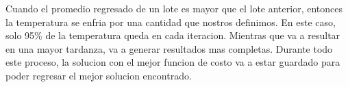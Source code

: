 \documentclass{article}
\begin{document}
    Cuando el promedio regresado de un lote es mayor que el lote anterior, entonces la temperatura se enfria
    por una cantidad que nostros definimos. En este caso, solo 95\% de la temperatura queda en cada iteracion.
    Mientras que va a resultar en una mayor tardanza, va a generar resultados mas completas. Durante todo este
    proceso, la solucion con el mejor funcion de costo va a estar guardado para poder regresar el mejor solucion
    encontrado. \\
    
    
    
\end{document}
